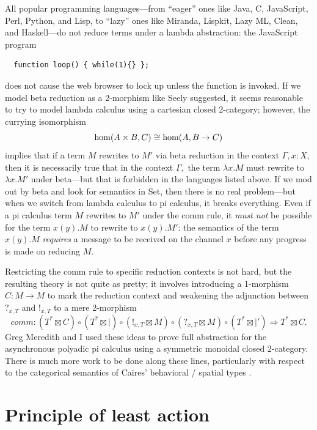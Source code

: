 \documentclass[12pt,twoside,openright]{report}
\newcommand{\maps}{\colon}
\renewcommand{\hom}{{\rm hom}}
\begin{document}
All popular programming languages---from ``eager'' ones like Java, C, JavaScript, Perl, Python, and Lisp, to ``lazy'' ones like Miranda, Lispkit, Lazy ML, Clean, and Haskell---do not reduce terms under a lambda abstraction: the JavaScript program
\begin{verbatim}
  function loop() { while(1){} };
\end{verbatim}
does not cause the web browser to lock up unless the function is invoked.  If we model beta reduction as a 2-morphism like Seely suggested, it seems reasonable to try to model lambda calculus using a cartesian closed 2-category; however, the currying isomorphism
\[ \hom(A\times B, C) \cong \hom(A, B \to C) \]
implies that if a term $M$ rewrites to $M'$ via beta reduction in the context $\Gamma, x: X$, then it is necessarily true that in the context $\Gamma,$ the term $\lambda x.M$ must rewrite to $\lambda x.M'$ under beta---but that is forbidden in the languages listed above.  If we mod out by beta and look for semantics in Set, then there is no real problem---but when we switch from lambda calculus to pi calculus, it breaks everything.  Even if a pi calculus term $M$ rewrites to $M'$ under the comm rule, it {\em must not} be possible for the term $x(y).M$ to rewrite to $x(y).M'$: the semantics of the term $x(y).M$ {\em requires} a message to be received on the channel $x$ before any progress is made on reducing $M$.

Restricting the comm rule to specific reduction contexts is not hard, but the resulting theory is not quite as pretty; it involves introducing a 1-morphism $C\maps M \to M$ to mark the reduction context and weakening the adjunction between $?_{x, T}$ and $!_{x, T}$ to a mere 2-morphism 
\[ comm\maps (T^* \boxtimes C) \circ (T^* \boxtimes |) \circ (!_{x, T} \boxtimes M) \circ (?_{x, T} \boxtimes M) \circ (T^* \boxtimes |') \Rightarrow T^* \boxtimes C.\]  Greg Meredith and I \cite{AC} used these ideas to prove full abstraction for the asynchronous polyadic pi calculus using a symmetric monoidal closed 2-category.  There is much more work to be done along these lines, particularly with respect to the categorical semantics of Caires' behavioral / spatial types \cite{Caires}.

\section{Principle of least action}
\end{document}
